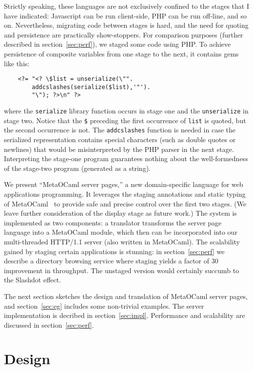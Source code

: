 \documentclass{elsart}
\def\MOC{MetaOCaml\xspace}
\begin{document}
Strictly speaking, these languages are not exclusively confined to the
stages that I have indicated: Javascript can be run client-side, PHP
can be run off-line, and so on.  Nevertheless, migrating code between
stages is hard, and the need for quoting and persistence are
practically show-stoppers.  For comparison purposes (further described
in section~\ref{sec:perf}), we staged some code using PHP.  To achieve
persistence of composite variables from one stage to the next, it
contains gems like this:\label{php-gem}
\begin{verbatim}
    <?= "<? \$list = unserialize(\"".
        addcslashes(serialize($list),'"').
        "\"); ?>\n" ?>
\end{verbatim}
where the \texttt{serialize} library function occurs in stage one and
the \texttt{unserialize} in stage two.  Notice that the \verb+$+
preceding the first occurrence of \verb+list+ is quoted, but the
second occurrence is not.  The \texttt{addcslashes} function is needed
in case the serialized representation contains special characters
(such as double quotes or newlines) that would be misinterpreted by
the PHP parser in the next stage.  Interpreting the stage-one program
guarantees nothing about the well-formedness of the stage-two program
(generated as a string).

We present ``\MOC server pages,'' a new domain-specific language for
web applications programming.  It leverages the staging annotations
and static typing of \MOC~\cite{calcagno03meta,taha00metaml} to
provide safe and precise control over the first two stages.  (We leave
further consideration of the display stage as future work.)  The
system is implemented as two components: a translator transforms the
server page language into a \MOC module, which then can be
incorporated into our multi-threaded HTTP/1.1 server (also written in
\MOC).  The scalability gained by staging certain applications is
stunning: in section~\ref{sec:perf} we describe a directory browsing
service where staging yields a factor of 30 improvement in throughput.
The unstaged version would certainly succumb to the Slashdot effect.

The next section sketches the design and translation of \MOC
server pages, and section~\ref{sec:eg} includes some non-trivial
examples.  The server implementation is decribed in
section~\ref{sec:impl}.  Performance and scalability are
discussed in section~\ref{sec:perf}.

\section{Design}
\label{sec:design}
\end{document}
